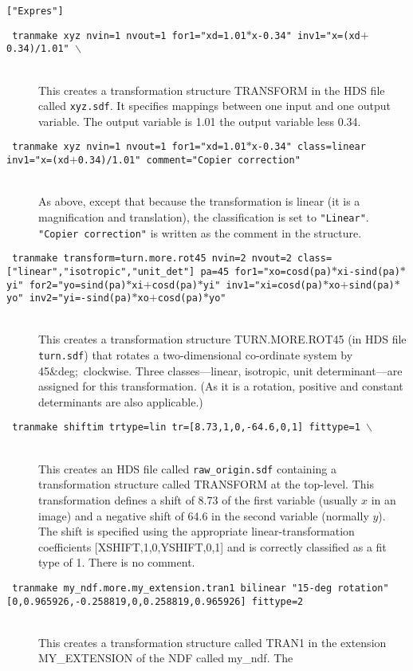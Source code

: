 \documentclass[twoside,11pt]{article}
\newcommand{\htmlref}[2]{#1}
\newcommand{\dgs}{\hbox{$^\circ$}}
\renewcommand{\dgs}{{\rawhtml &deg;}}
\newcommand{\sstexamples}[1]{
   \goodbreak
   \item[Examples:] \mbox{} \\
   \vspace{-3.5ex}
   \begin{description}
      #1
   \end{description}
}
\newcommand{\sstexamplesubsection}[2]{\sloppy \item{\ssttt #1} \mbox{} \\ #2 }
\newcommand{\ssttt}{\tt}
\renewcommand{\sstexamples}[1]{
      \htmlref{\item[Examples:]}{ap:example}
      \begin{description}
         #1
      \end{description}
   }
\renewcommand{\sstexamplesubsection}[2]{\item[{\ssttt #1}] \\ #2}
\begin{document}
{{{         {\tt ["Expres"]}
      }
   }
   \sstexamples{
      \sstexamplesubsection{
         tranmake xyz nvin=1 nvout=1 for1="xd=1.01$*$x-0.34"
         inv1="x=(xd$+$0.34)/1.01" $\backslash$
      }{
          This creates a transformation structure TRANSFORM in the HDS  
          file called {\tt xyz.sdf}.  It specifies mappings between one input and
          one output variable.  The output variable is 1.01 the output
          variable less 0.34. 
      }
      \sstexamplesubsection{
         tranmake xyz nvin=1 nvout=1 for1="xd=1.01$*$x-0.34" class=linear
         inv1="x=(xd$+$0.34)/1.01" comment="Copier correction"
      }{
          As above, except that because the transformation is linear
          (it is a magnification and translation), the classification is
          set to {\tt "Linear"}.  {\tt "Copier correction"} is written
          as the comment in the structure.
      }
      \sstexamplesubsection{
         tranmake transform=turn.more.rot45 nvin=2 nvout=2
         class=["linear","isotropic","unit\_det"] pa=45
         for1="xo=cosd(pa)$*$xi-sind(pa)$*$yi"
         for2="yo=sind(pa)$*$xi$+$cosd(pa)$*$yi"
         inv1="xi=cosd(pa)$*$xo$+$sind(pa)$*$yo"
         inv2="yi=-sind(pa)$*$xo$+$cosd(pa)$*$yo"
      }{
          This creates a transformation structure TURN.MORE.ROT45
          (in HDS file {\tt turn.sdf}) that rotates
          a two-dimensional co-ordinate system by 45\dgs\ clockwise.
          Three classes---linear, isotropic, unit determinant---are
          assigned for this transformation.  (As it is
          a rotation, positive and constant determinants are also
          applicable.)
      }
      \sstexamplesubsection{
         tranmake shiftim trtype=lin tr=[8.73,1,0,-64.6,0,1] fittype=1 $\backslash$
      }{
         This creates an HDS file called {\tt raw\_origin.sdf} containing a
         transformation structure called TRANSFORM at the top-level.
         This transformation defines a shift of 8.73 of the first
         variable (usually $x$ in an image) and a negative shift of 64.6
         in the second variable (normally $y$).  The shift is specified
         using the appropriate linear-transformation coefficients
         [XSHIFT,1,0,YSHIFT,0,1] and is correctly classified as a
         fit type of 1.  There is no comment.
      }
      \sstexamplesubsection{
         tranmake my\_ndf.more.my\_extension.tran1 bilinear "15-deg rotation"
         [0,0.965926,-0.258819,0,0.258819,0.965926] fittype=2
      }{
         This creates a transformation structure called TRAN1
         in the extension MY\_EXTENSION of the NDF called my\_ndf.  The
}}}
\end{document}
